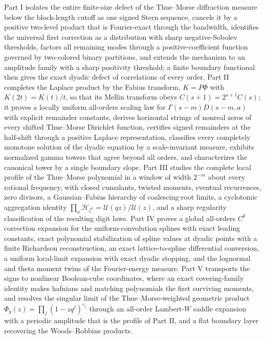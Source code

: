 \documentclass[11pt,a4paper,oneside,openany]{book}
\numberwithin{equation}{chapter}
\theoremstyle{definition}
\theoremstyle{remark}
\newcommand{\eps}{\varepsilon}
\newcommand{\Up}{\mathcal U}
\newcommand{\Hp}{\mathcal H}
\begin{document}
Part I isolates the entire finite-size defect of the Thue--Morse diffraction
measure below the block-length cutoff as one signed Stern sequence, cancels it
by a positive two-level product that is Fourier-exact through the bandwidth,
identifies the universal first correction as a distribution with sharp
negative-Sobolev thresholds, factors all remaining modes through a
positive-coefficient function governed by two-colored binary partitions, and
extends the mechanism to an amplitude family with a sharp positivity
threshold; a finite boundary functional then gives the exact dyadic defect of
correlations of every order. Part II completes the Laplace product by the
Fabius transform, $K=P\Phi$ with $K(2t)=K(t)/t$, so that its Mellin transform
obeys $C(s+1)=2^{s+1}C(s)$; it proves a locally uniform all-orders scaling law
for $\Gamma(s-m)D(s-m,a)$ with explicit remainder constants, derives
horizontal strings of nonreal zeros of every shifted Thue--Morse Dirichlet
function, certifies signed remainders at the half-shift through a positive
Laplace representation, classifies every completely monotone solution of the
dyadic equation by a scale-invariant measure, exhibits normalized gamma
towers that agree beyond all orders, and characterizes the canonical tower by
a single boundary slope. Part III studies the complete local profile of the
Thue--Morse polynomial in a window of width $2^{-m}$ about every rational
frequency, with closed cumulants, twisted moments, eventual recurrences,
zero divisors, a Gaussian--Fabius hierarchy of coalescing-root limits, a
cyclotomic aggregation identity $\prod_a\Hp_{\zeta^a}=\Up(qz)/\Up(z)$, and a
sharp regularity classification of the resulting digit laws. Part IV proves a
global all-orders $C^k$ correction expansion for the uniform-convolution
splines with exact leading constants, exact polynomial stabilization of
spline values at dyadic points with a finite Richardson reconstruction, an
exact lattice-to-spline differential conversion, a uniform local-limit
expansion with exact dyadic stopping, and the lognormal and theta moment
twins of the Fourier-energy measure. Part V transports the signs to nonlinear
Boolean-cube coordinates, where an exact covering-family identity makes
hafnians and matching polynomials the first surviving moments, and resolves
the singular limit of the Thue--Morse-weighted geometric product
$\Phi_q(z)=\prod_j(1-zq^j)^{\eps_j}$ through an all-order Lambert-$W$ saddle
expansion with a periodic amplitude that is the profile of Part II, and a
flat boundary layer recovering the Woods--Robbins products.
\end{document}
